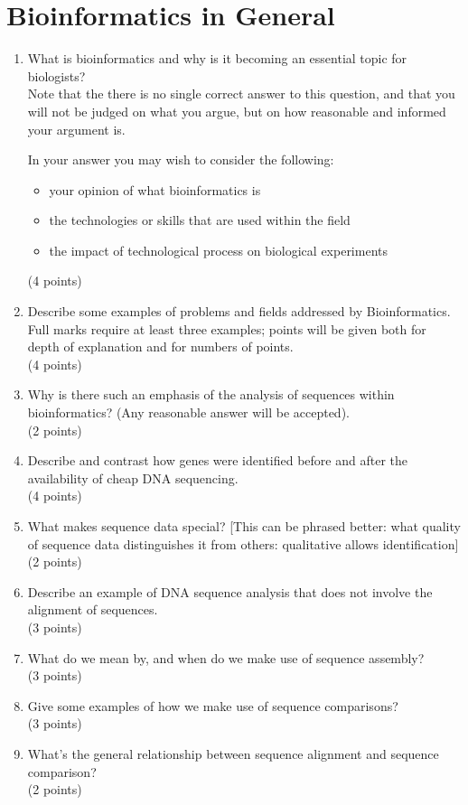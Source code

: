 \documentclass[11pt]{article}
\begin{document}
\section{Bioinformatics in General}
\begin{enumerate}
\item What is bioinformatics and why is it becoming an essential topic for
  biologists?\\
  Note that the there is no single correct answer to this question, and that
  you will not be judged on what you argue, but on how reasonable and informed
  your argument is.
  
  In your answer you may wish to consider the following:
  \begin{itemize}
  \item your opinion of what bioinformatics is
  \item the technologies or skills that are used within the field
  \item the impact of technological process on biological experiments
  \end{itemize}
  (4 points)
\item Describe some examples of problems and fields addressed by
  Bioinformatics. Full marks require at least three examples; points
  will be given both for depth of explanation and for numbers of points.\\
  (4 points)
\item Why is there such an emphasis of the analysis of sequences within
  bioinformatics? (Any reasonable answer will be accepted).\\
  (2 points)
\item Describe and contrast how genes were identified before and after the
  availability of cheap DNA sequencing.\\
  (4 points)
\item What makes sequence data special?  [This can be phrased better: what quality
  of sequence data distinguishes it from others: qualitative allows identification]\\
  (2 points)
\item Describe an example of DNA sequence analysis that does not involve the
  alignment of sequences.\\
  (3 points)
\item What do we mean by, and when do we make use of sequence assembly?\\
  (3 points)
\item Give some examples of how we make use of sequence comparisons?\\
  (3 points)
\item What's the general relationship between sequence alignment and
  sequence comparison?\\
  (2 points)
\end{enumerate}
\end{document}
